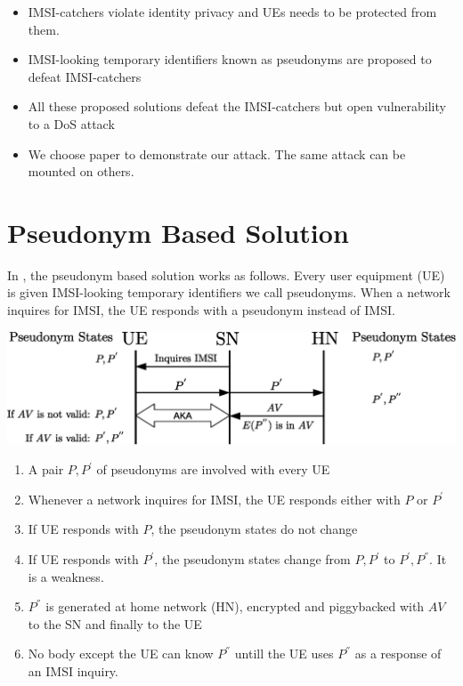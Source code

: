 \documentclass[portrait,a0]{a0poster}
\begin{document}
\begin{multicols}{2}
\begin{itemize}
\item IMSI-catchers violate identity privacy and UEs needs to be protected from them.
\item IMSI-looking temporary identifiers known as pseudonyms are proposed \citep{Ginzboorg_Niemi_2016,Norrman_Naslund_Dubrova_2016,CCS15,SSR15} to defeat IMSI-catchers
\item All these proposed solutions defeat the IMSI-catchers but open vulnerability to a DoS attack
\item We choose \citep{CCS15} paper to demonstrate our attack. The same attack can be mounted on others.
\end{itemize}


\section{Pseudonym Based Solution}
In \citep{CCS15}, the pseudonym based solution works as follows. Every user equipment (UE) is given IMSI-looking temporary identifiers we call pseudonyms. When a network inquires for IMSI, the UE responds with a pseudonym instead of IMSI.

\begin{center}
\begin{minipage}[t]{0.9\linewidth} %
\vspace{.5cm} %
\includegraphics[width=1\linewidth]{ccs_solution.eps}
\hspace{0pt}
\vspace{.5cm}
\end{minipage} 
\end{center}

\begin{enumerate}
\item A pair $P,P^{'}$ of pseudonyms are involved with every UE
\item Whenever a network inquires for IMSI, the UE responds either with $P$ or $P^{'}$
\item If UE responds with $P$, the pseudonym states do not change
\item If UE responds with $P^{'}$, the pseudonym states change from $P,P^{'}$ to $P^{'},P^{''}$. It is a weakness.
\item $P^{''}$ is generated at home network (HN), encrypted and piggybacked with $AV$ to the SN and finally to the UE
\item No body except the UE can know $P^{''}$ untill the UE uses $P^{''}$ as a response of an IMSI inquiry.
\end{enumerate}


\end{multicols}
\end{document}
